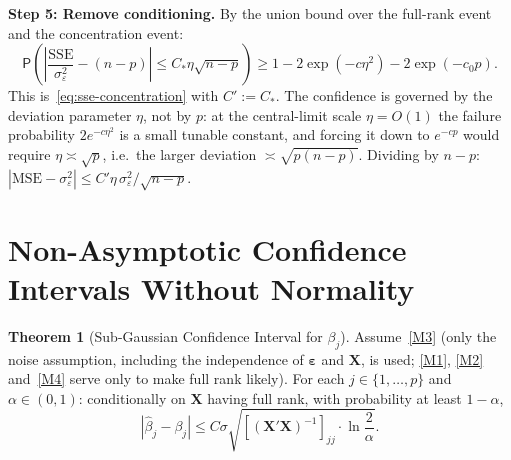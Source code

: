 \documentclass[12pt,a4paper]{article}
\makeatletter
\theoremstyle{definition}
\newtheorem{theorem}{Theorem}[section]
\renewenvironment{proof}[1][\proofname]{\par
  \pushQED{\qed}%
  \normalfont \topsep6\p@\@plus6\p@\relax
  \trivlist
  \item[\hskip\labelsep\bfseries #1\@addpunct{.}]\ignorespaces
}{%
  \popQED\endtrivlist\@endpefalse
}
\newcommand\prb{\mathsf{P}}
\newcommand{\SSE}{\mathrm{SSE}}
\newcommand{\MSE}{\mathrm{MSE}}
\newcommand{\bX}{\mathbf{X}}
\newcommand{\be}{\boldsymbol{\varepsilon}}
\makeatother
\begin{document}
\begin{proof}
\textbf{Step 5: Remove conditioning.} By the union bound over the full-rank event and the concentration event:
\[
\prb\!\left(\left|\frac{\SSE}{\sigma_\varepsilon^2} - (n-p)\right| \leqslant C_*\eta\sqrt{n-p}\right) \geqslant 1 - 2\exp(-c\eta^2) - 2\exp(-c_0 p).
\]
This is~\eqref{eq:sse-concentration} with $C' := C_*$. The confidence is governed by the deviation parameter $\eta$, not by $p$: at the central-limit scale $\eta = O(1)$ the failure probability $2e^{-c\eta^2}$ is a small tunable constant, and forcing it down to $e^{-cp}$ would require $\eta \asymp \sqrt{p}$, i.e.\ the larger deviation $\asymp\sqrt{p(n-p)}$. Dividing by $n - p$: $|\MSE - \sigma_\varepsilon^2| \leqslant C'\eta\,\sigma_\varepsilon^2/\sqrt{n-p}$.
\end{proof}

\section{Non-Asymptotic Confidence Intervals Without Normality}\label{sec:confidence}

\begin{theorem}[Sub-Gaussian Confidence Interval for $\beta_j$]\label{thm:ci-modern}
Assume~\ref{M3} (only the noise assumption, including the independence of $\be$ and $\bX$, is used; \ref{M1}, \ref{M2} and~\ref{M4} serve only to make full rank likely). For each $j \in \{1, \ldots, p\}$ and $\alpha \in (0,1)$: conditionally on $\bX$ having full rank, with probability at least $1 - \alpha$,
\begin{equation}\label{eq:ci-modern}
|\hat\beta_j - \beta_j| \leqslant C\sigma\sqrt{[(\bX'\bX)^{-1}]_{jj}\cdot\ln\frac{2}{\alpha}}.
\end{equation}
\end{theorem}
\end{document}
